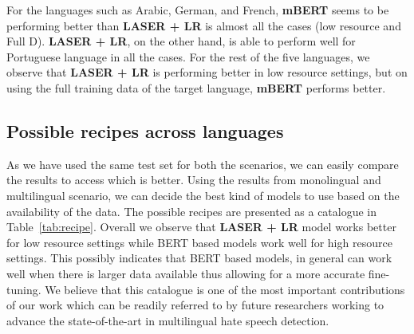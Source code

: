 \documentclass[runningheads]{llncs}
\begin{document}
For the languages such as Arabic, German, and French, \textbf{mBERT} seems to be performing better than \textbf{LASER + LR} is almost all the cases (low resource and Full D). \textbf{LASER + LR}, on the other hand, is able to perform well for Portuguese language in all the cases. For the rest of the five languages, we observe that \textbf{LASER + LR} is performing better in low resource settings, but on using the full training data of the target language, \textbf{mBERT} performs better.



\subsection{Possible recipes across languages}
As we have used the same test set for both the scenarios, we can easily compare the results to access which is better. Using the results from monolingual and multilingual scenario, we can decide the best kind of models to use based on the availability of the data. The possible recipes are presented as a catalogue in Table~\ref{tab:recipe}. Overall we observe that \textbf{LASER + LR} model works better for low resource settings while BERT based models work well for high resource settings. This possibly indicates that BERT based models, in general can work well when there is larger data available thus allowing for a more accurate fine-tuning. We believe that this catalogue is one of the most important contributions of our work which can be readily referred to by future researchers working to advance the state-of-the-art in multilingual hate speech detection.
\end{document}
